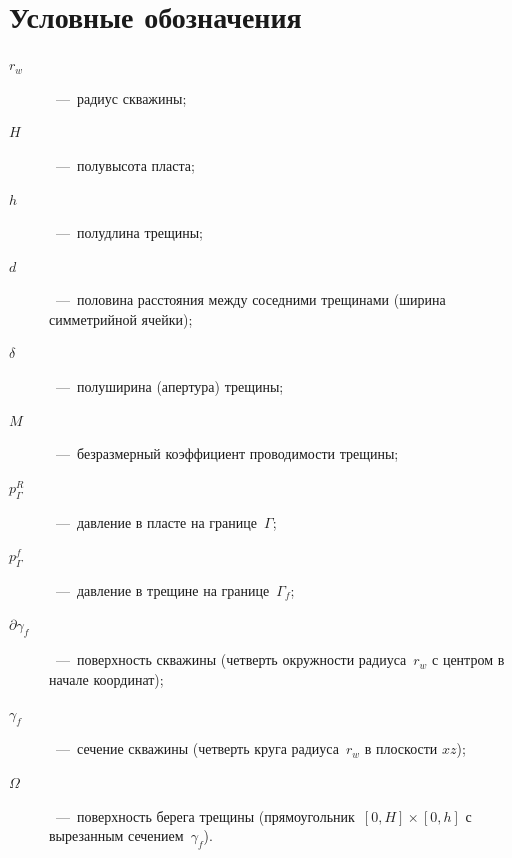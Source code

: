 \documentclass{article}
\begin{document}



\section*{Условные обозначения}

\begin{description}
	\item[$r_w$]~---~радиус скважины;
	\item[$H$]~---~полувысота пласта;
	\item[$h$]~---~полудлина трещины;
	\item[$d$]~---~половина расстояния между соседними трещинами (ширина симметрийной ячейки);
	\item[$\delta$]~---~полуширина (апертура) трещины;
	\item[$M$]~---~безразмерный коэффициент проводимости трещины;
	\item[$p_\Gamma^R$]~---~давление в пласте на границе~$\Gamma$;
	\item[$p_\Gamma^f$]~---~давление в трещине на границе~$\Gamma_f$;
	\item[$\partial\gamma_f$]~---~поверхность скважины (четверть окружности радиуса~$r_w$ с центром в начале координат);
	\item[$\gamma_f$]~---~сечение скважины (четверть круга радиуса~$r_w$ в плоскости $xz$);
	\item[$\Omega$]~---~поверхность берега трещины (прямоугольник~$[0,H]\times[0,h]$ с вырезанным сечением~$\gamma_f$).
\end{description}




\end{document}
